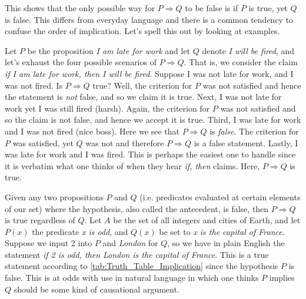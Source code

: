         \par\vspace{2.5ex}
        This shows that the only possible way for $P\Rightarrow{Q}$ to be false
        is if $P$ is true, yet $Q$ is false. This differs from everyday language
        and there is a common tendency to confuse the order of implication.
        Let's spell this out by looking at examples.
        \begin{example}
            \label{ex:Mathematical_Implication}%
            Let $P$ be the proposition \textit{I am late for work} and let $Q$
            denote \textit{I will be fired}, and let's exhaust the four
            possible scenarios of $P\Rightarrow{Q}$. That is, we consider the
            claim \textit{if I am late for work, then I will be fired}. Suppose
            I was not late for work, and I was not fired. Is $P\Rightarrow{Q}$
            true? Well, the criterion for $P$ was not satisfied and hence the
            statement is \textit{not} false, and so we claim it is true. Next, I
            was not late for work yet I was still fired (harsh). Again, the
            criterion for $P$ was not satisfied and so the claim is not false,
            and hence we accept it is true. Third, I was late for work and I was
            not fired (nice boss). Here we see that $P\Rightarrow{Q}$ is
            \textit{false}. The criterion for $P$ was satisfied, yet $Q$ was not
            and therefore $P\Rightarrow{Q}$ is a false statement. Lastly, I was
            late for work and I was fired. This is perhaps the easiest one to
            handle since it is verbatim what one thinks of when they hear
            \textit{if, then} claims. Here, $P\Rightarrow{Q}$ is true.
        \end{example}
        \begin{example}
            \label{ex:False_Antecedent}%
            Given any two propositions $P$ and $Q$ (i.e. predicates evaluated at
            certain elements of our set) where the hypothesis, also called the
            antecedent, is false, then $P\Rightarrow{Q}$ is true regardless of
            $Q$. Let $A$ be the set of all integers and cities of Earth, and let
            $P(x)$ the predicate \textit{x is odd}, and $Q(x)$ be set to
            \textit{x is the capital of France}. Suppose we input 2 into $P$ and
            \textit{London} for $Q$, so we have in plain English the statement
            \textit{if 2 is odd, then London is the capital of France}. This is
            a true statement according to \ref{tab:Truth_Table_Implication}
            since the hypothesis $P$ is false. This is at odds with use in
            natural language in which one thinks $P$ implies $Q$ should be some
            kind of causational argument.
        \end{example}
